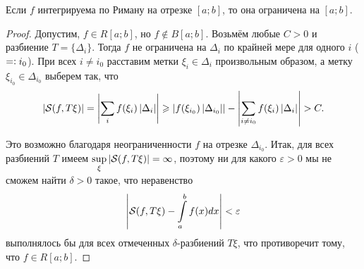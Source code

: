 \begin{proposal}
    Если $f$ интегрируема по Риману на отрезке $[a; b]$, то она ограничена на $[a; b]$.
\end{proposal}

\begin{proof}
    Допустим, $f \in R[a; b]$, но $f \notin B[a; b]$. Возьмём любые $C > 0$ и разбиение $T = \{\Delta_i\}$. Тогда $f$ не ограничена на $\Delta_i$ по крайней мере для одного $i$ ($=\vcentcolon i_0$). При всех $i \ne i_0$ расставим метки $\xi_i \in \Delta_i$ произвольным образом, а метку $\xi_{i_0} \in \Delta_{i_0}$ выберем так, что
    \[
        \left\lvert\mathcal{S}(f, T\xi)\right\rvert = \left\lvert\sum_if(\xi_i)\left\lvert\Delta_i\right\rvert\right\rvert \geqslant \left\lvert f(\xi_{i_0})\left\lvert\Delta_{i_0}\right\rvert\right\rvert - \left\lvert\sum_{i \ne i_0}f(\xi_i)\left\lvert\Delta_i\right\rvert\right\rvert > C.
    \]

    Это возможно благодаря неограниченности $f$ на отрезке $\Delta_{i_0}$. Итак, для всех разбиений $T$ имеем $\sup\limits_\xi\left\lvert\mathcal{S}(f, T\xi)\right\rvert = \infty$, поэтому ни для какого $\varepsilon > 0$ мы не сможем найти $\delta > 0$ такое, что неравенство \[\displaystyle\left\lvert\mathcal{S}(f, T\xi) - \int\limits_a^bf(x)dx\right\rvert < \varepsilon\] выполнялось бы для всех отмеченных $\delta$-разбиений $T\xi$, что противоречит тому, что $f \in R[a; b]$.
\end{proof}

